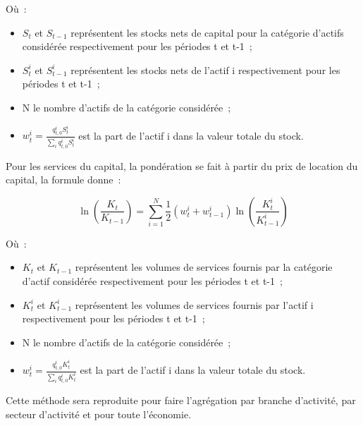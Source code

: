 \documentclass[12pt,a4paper,oneside]{report}
\begin{document}
Où~:

\begin{itemize}

\item \({S}_{t}\) et \({S}_{t-1}\) représentent les stocks nets de capital pour la catégorie d’actifs
considérée respectivement pour les périodes t et t-1~;

\item \({S}_{t}^{i}\) et \({S}_{t-1}^{i}\) représentent les stocks nets de l’actif i respectivement pour les
périodes t et t-1~;

\item N le nombre d’actifs de la catégorie considérée~;

\item \({w}_{t}^{i}=\frac{{q}_{t,0}^{i}{S}_{t}^{i}}{\sum_{i} {q}_{t,0}^{i}{S}_{t}^{i}}\) est la part de
l’actif i dans la valeur totale du stock.

\end{itemize}

Pour les services du capital, la pondération se fait à partir du prix de location du capital, la formule
donne~:

\[
\ln \left( \frac{{K}_{t}}{{K}_{t-1}}\right)=\sum_{i=1}^{N} \frac{1}{2}\left( {w}_{t}^{i}+{w}_{t-1}^{i}\right)\ln(\frac{{K}_{t}^{i}}{{K}_{t-1}^{i}})
\]

Où~:

\begin{itemize}

\item \({K}_{t}\) et \({K}_{t-1}\) représentent les volumes de services fournis par la catégorie d’actif
considérée respectivement pour les périodes t et t-1~;

\item \({K}_{t}^{i}\) et \({K}_{t-1}^{i}\) représentent les volumes de services fournis par l’actif i
respectivement pour les périodes t et t-1~;

\item N le nombre d’actifs de la catégorie considérée~;

\item \({w}_{t}^{i}=\frac{{q}_{t,0}^{i}{K}_{t}^{i}}{\sum_{i} {q}_{t,0}^{i}{K}_{t}^{i}}\) est la part de
l’actif i dans la valeur totale du stock.

\end{itemize}

Cette méthode sera reproduite pour faire l’agrégation par branche d’activité, par secteur d’activité et pour
toute l’économie.
\end{document}
